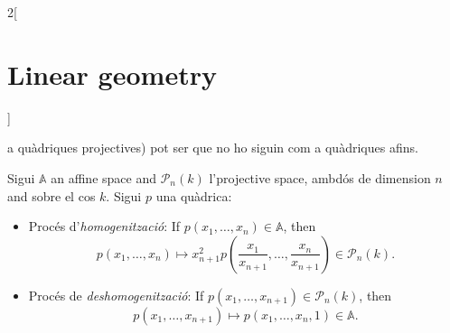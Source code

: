 \documentclass[class=article,10pt,crop=false]{standalone}
\begin{document}
\begin{multicols}{2}[\section{Linear geometry}]
\begin{theorem}
{a quàdriques projectives) pot ser que no ho siguin com a quàdriques afins.}
\end{theorem}
\begin{prop}
Sigui $\mathbb{A}$ an affine space and $\mathcal{P}_n(k)$ l'projective space, ambdós de dimension $n$ and sobre el cos $k$. Sigui $p$ una quàdrica:
\begin{itemize}
    \item Procés d'\textit{homogenització}: If $p(x_1,\ldots,x_n)\in\mathbb{A}$, then $$p(x_1,\ldots,x_n)\mapsto x_{n+1}^2p\left(\frac{x_1}{x_{n+1}},\ldots,\frac{x_n}{x_{n+1}}\right)\in\mathcal{P}_n(k).$$
    \item Procés de \textit{deshomogenització}: If $p(x_1,\ldots,x_{n+1})\in\mathcal{P}_n(k)$, then $$p(x_1,\ldots,x_{n+1})\mapsto p(x_1,\ldots,x_n,1)\in\mathbb{A}.$$
\end{itemize}
\end{prop}

\end{multicols}
\end{document}
